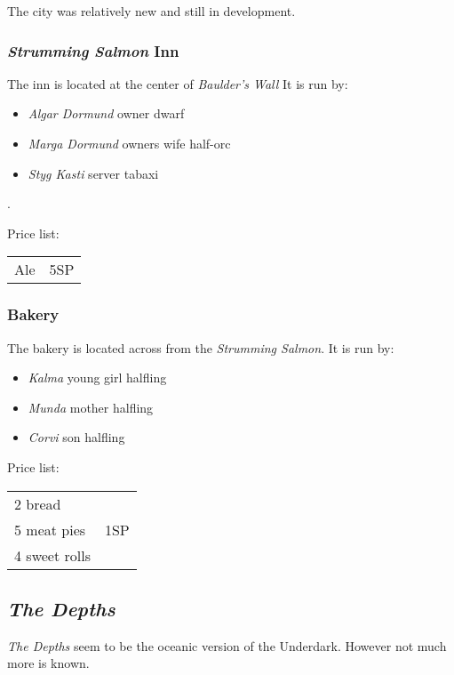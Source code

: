 \documentclass{article}
\begin{document}
\begin{multicols}{2}
    The city was relatively new and still in development.

    \subsubsection{ \textit{Strumming Salmon} Inn}

    The inn is located at the center of \textit{Baulder's Wall} It is run by:

    \begin{itemize}
        \item \textit{Algar Dormund} owner dwarf
        \item \textit{Marga Dormund} owners wife half-orc
        \item \textit{Styg Kasti} server tabaxi
    \end{itemize}.

    Price list:

    \begin{tabular}{l r}
        Ale & 5SP
    \end{tabular}

    \subsubsection{Bakery}

    The bakery is located across from the \textit{Strumming Salmon}. It is run by:

    \begin{itemize}
        \item \textit{Kalma} young girl halfling
        \item \textit{Munda} mother halfling
        \item \textit{Corvi} son halfling
    \end{itemize}

    Price list:

    \begin{tabular}{l r}
        2 bread & \multirow{3}{1cm}{1SP} \\
        5 meat pies                      \\
        4 sweet rolls
    \end{tabular}

    \subsection{\textit{The Depths}}

    \textit{The Depths} seem to be the oceanic version of the Underdark. However not much more is known.


\end{multicols}
\end{document}

